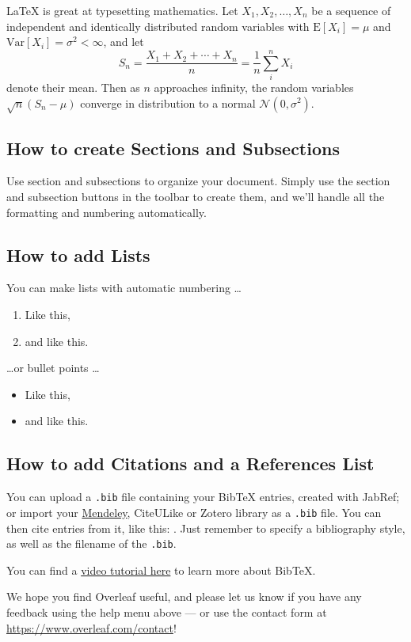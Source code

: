 \documentclass[a4paper]{article}
\begin{document}
\LaTeX{} is great at typesetting mathematics. Let $X_1, X_2, \ldots, X_n$ be a sequence of independent and identically distributed random variables with $\text{E}[X_i] = \mu$ and $\text{Var}[X_i] = \sigma^2 < \infty$, and let
\[S_n = \frac{X_1 + X_2 + \cdots + X_n}{n}
      = \frac{1}{n}\sum_{i}^{n} X_i\]
denote their mean. Then as $n$ approaches infinity, the random variables $\sqrt{n}(S_n - \mu)$ converge in distribution to a normal $\mathcal{N}(0, \sigma^2)$.


\subsection{How to create Sections and Subsections}

Use section and subsections to organize your document. Simply use the section and subsection buttons in the toolbar to create them, and we'll handle all the formatting and numbering automatically.

\subsection{How to add Lists}

You can make lists with automatic numbering \dots

\begin{enumerate}
\item Like this,
\item and like this.
\end{enumerate}
\dots or bullet points \dots
\begin{itemize}
\item Like this,
\item and like this.
\end{itemize}

\subsection{How to add Citations and a References List}

You can upload a \verb|.bib| file containing your BibTeX entries, created with JabRef; or import your \href{https://www.overleaf.com/blog/184}{Mendeley}, CiteULike or Zotero library as a \verb|.bib| file. You can then cite entries from it, like this: \cite{greenwade93}. Just remember to specify a bibliography style, as well as the filename of the \verb|.bib|.

You can find a \href{https://www.overleaf.com/help/97-how-to-include-a-bibliography-using-bibtex}{video tutorial here} to learn more about BibTeX.

We hope you find Overleaf useful, and please let us know if you have any feedback using the help menu above --- or use the contact form at \url{https://www.overleaf.com/contact}!



\end{document}
